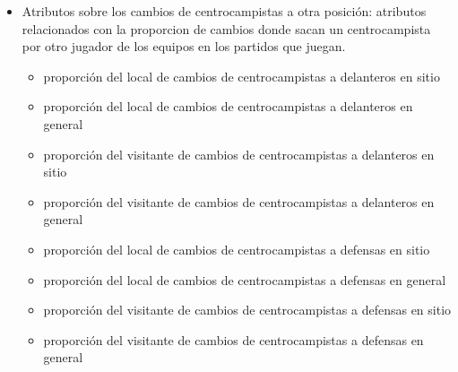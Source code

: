 \begin{itemize}
\begin{itemize}
          \end{itemize}
    \item Atributos sobre los cambios de centrocampistas a otra posición: atributos relacionados con la proporcion de cambios donde sacan un centrocampista por otro jugador de los equipos en los partidos que juegan.
          \begin{itemize}
              \item proporción del local de cambios de centrocampistas a delanteros en sitio
              \item proporción del local de cambios de centrocampistas a delanteros en general
              \item proporción del visitante de cambios de centrocampistas a delanteros en sitio
              \item proporción del visitante de cambios de centrocampistas a delanteros en general
              \item proporción del local de cambios de centrocampistas a defensas en sitio
              \item proporción del local de cambios de centrocampistas a defensas en general
              \item proporción del visitante de cambios de centrocampistas a defensas en sitio
              \item proporción del visitante de cambios de centrocampistas a defensas en general


\end{itemize}
\end{itemize}
